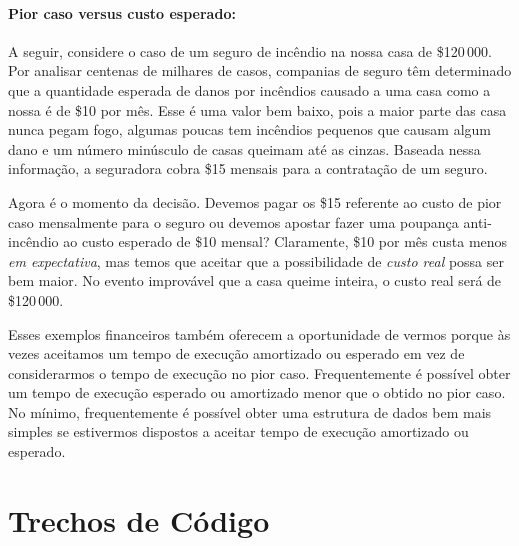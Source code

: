 \paragraph{Pior caso versus custo esperado:}
%
A seguir, considere o caso de um seguro de incêndio na nossa casa de \$120\,000.
Por analisar centenas de milhares de casos, companias de seguro têm determinado que a quantidade esperada de danos por incêndios causado a uma casa como a nossa é de
\$10 por mês.  
Esse é uma valor bem baixo, pois a maior parte das casa nunca pegam fogo, algumas poucas tem incêndios pequenos que causam algum dano e um número minúsculo de casas queimam até as cinzas. Baseada nessa informação, a seguradora cobra
\$15 mensais para a contratação de um seguro.

Agora é o momento da decisão. Devemos pagar os 
 \$15 referente ao custo de pior caso mensalmente para o seguro ou devemos
apostar fazer uma poupança anti-incêndio ao custo esperado de
\$10 mensal?  Claramente, \$10 por mês custa menos \emph{em expectativa},
mas temos que aceitar que a possibilidade de \emph{custo real} possa ser bem maior.
No evento improvável que a casa queime inteira, o custo real será de \$120\,000.

Esses exemplos financeiros também oferecem a oportunidade de vermos porque às vezes aceitamos um tempo de execução amortizado ou esperado em vez de considerarmos o tempo de execução no pior caso. Frequentemente é possível obter um tempo de execução esperado ou amortizado menor que o obtido no pior caso. 
No mínimo, frequentemente é possível obter uma estrutura de dados bem mais simples se estivermos dispostos a aceitar tempo de execução amortizado ou esperado.

\section{Trechos de Código}


